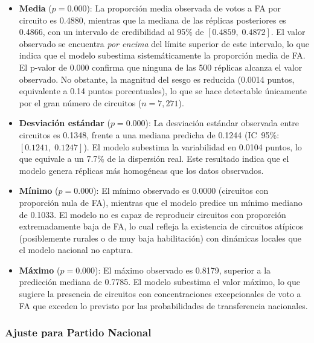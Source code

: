 \begin{itemize}
    \item \textbf{Media} ($p = 0.000$): La proporci\'on media observada de votos a FA por circuito es 0.4880, mientras que la mediana de las r\'eplicas posteriores es 0.4866, con un intervalo de credibilidad al 95\% de $[0.4859,\; 0.4872]$. El valor observado se encuentra \emph{por encima} del l\'imite superior de este intervalo, lo que indica que el modelo subestima sistem\'aticamente la proporci\'on media de FA. El p-valor de 0.000 confirma que ninguna de las 500 r\'eplicas alcanza el valor observado. No obstante, la magnitud del sesgo es reducida (0.0014 puntos, equivalente a 0.14 puntos porcentuales), lo que se hace detectable \'unicamente por el gran n\'umero de circuitos ($n = 7{,}271$).

    \item \textbf{Desviaci\'on est\'andar} ($p = 0.000$): La desviaci\'on est\'andar observada entre circuitos es 0.1348, frente a una mediana predicha de 0.1244 (IC~95\%: $[0.1241,\; 0.1247]$). El modelo subestima la variabilidad en 0.0104 puntos, lo que equivale a un 7.7\% de la dispersi\'on real. Este resultado indica que el modelo genera r\'eplicas m\'as homog\'eneas que los datos observados.

    \item \textbf{M\'inimo} ($p = 0.000$): El m\'inimo observado es 0.0000 (circuitos con proporci\'on nula de FA), mientras que el modelo predice un m\'inimo mediano de 0.1033. El modelo no es capaz de reproducir circuitos con proporci\'on extremadamente baja de FA, lo cual refleja la existencia de circuitos at\'ipicos (posiblemente rurales o de muy baja habilitaci\'on) con din\'amicas locales que el modelo nacional no captura.

    \item \textbf{M\'aximo} ($p = 0.000$): El m\'aximo observado es 0.8179, superior a la predicci\'on mediana de 0.7785. El modelo subestima el valor m\'aximo, lo que sugiere la presencia de circuitos con concentraciones excepcionales de voto a FA que exceden lo previsto por las probabilidades de transferencia nacionales.
\end{itemize}

\subsubsection{Ajuste para Partido Nacional}

